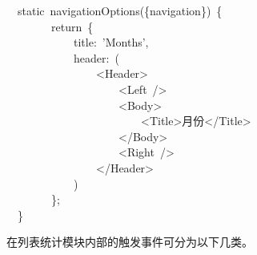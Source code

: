 \documentclass{article}
\begin{document}
\begin{mdpre}%
\noindent~~{static}~navigationOptions(\{navigation\})~\{\\
~~~~~~~~{return}~\{\\
~~~~~~~~~~~~title:~{'}{Months}{'},\\
~~~~~~~~~~~~header:~(\\
~~~~~~~~~~~~~~~~\textless{}Header\textgreater{}\\
~~~~~~~~~~~~~~~~~~~~\textless{}Left~/\textgreater{}\\
~~~~~~~~~~~~~~~~~~~~\textless{}Body\textgreater{}\\
~~~~~~~~~~~~~~~~~~~~~~~~\textless{}Title\textgreater{}月份\textless{}/Title\textgreater{}\\
~~~~~~~~~~~~~~~~~~~~\textless{}/Body\textgreater{}\\
~~~~~~~~~~~~~~~~~~~~\textless{}Right~/\textgreater{}\\
~~~~~~~~~~~~~~~~\textless{}/Header\textgreater{}\\
~~~~~~~~~~~~)\\
~~~~~~~~\};\\
~~\}%
\end{mdpre}\noindent{}在列表统计模块内部的触发事件可分为以下几类。
\end{document}
